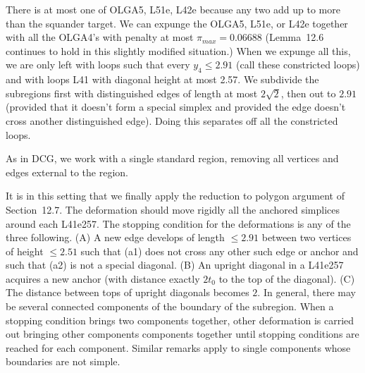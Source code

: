 \documentclass[11pt]{amsart}
\begin{document}
There is at most one of OLGA5, L51e, L42e because any two add up to more
than the squander target.  We can expunge the OLGA5, L51e, or L42e together
with all the OLGA4's with penalty at most $\pi_{max}=0.06688$ (Lemma~12.6 continues
to hold in this slightly modified situation.)  When we expunge all this,
we are only left with loops such that every $y_4\le 2.91$ (call these constricted loops) and with loops L41
with diagonal height at most 2.57.    We subdivide the subregions first with
distinguished edges of length at most $2\sqrt2$, then out to $2.91$ (provided
that it doesn't form a special simplex and provided the edge doesn't cross another distinguished edge).  Doing this separates off all the
constricted loops.  

As in DCG, we work with a single standard region, 
removing all vertices and edges
external to the region.

It is in this setting that we finally apply the reduction to polygon argument of
Section~12.7.  The deformation should move rigidly all the anchored simplices around each L41e257.  
The stopping condition for the deformations is any of the three
following.  (A) A new edge develops of length $\le2.91$ between two vertices
of height $\le 2.51$ such that (a1) does not cross any other such edge or anchor and such that (a2) is not a special diagonal.  (B) An upright diagonal in a L41e257 acquires a new anchor
(with distance exactly $2t_0$ to the top of the diagonal).  (C) The distance
between tops of upright diagonals becomes $2$.  In general, there
may be several connected components of the boundary of the subregion.
When a stopping condition brings two components together, other deformation is carried out bringing other components components together until stopping
conditions are reached for each component.  Similar remarks apply
to single components whose boundaries are not simple.
\end{document}
